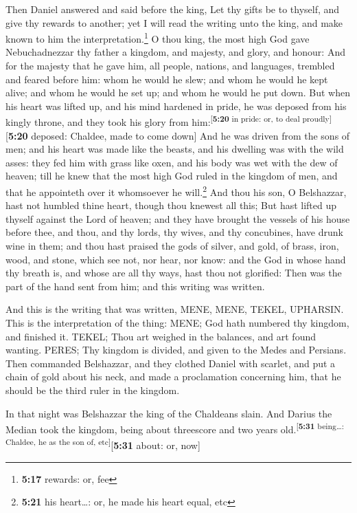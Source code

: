  Then Daniel answered and said before the king, Let thy
gifts be to thyself, and give thy rewards to another; yet I will read
the writing unto the king, and make known to him the
interpretation.\footnote{\textbf{5:17} rewards: or, fee} 
O thou king, the most high God gave Nebuchadnezzar thy father a kingdom,
and majesty, and glory, and honour:  And for the majesty
that he gave him, all people, nations, and languages, trembled and
feared before him: whom he would he slew; and whom he would he kept
alive; and whom he would he set up; and whom he would he put down.
 But when his heart was lifted up, and his mind hardened
in pride, he was deposed from his kingly throne, and they took his glory
from him:\textsuperscript{{[}\textbf{5:20} in pride: or, to deal
proudly{]}}{[}\textbf{5:20} deposed: Chaldee, made to come down{]}
 And he was driven from the sons of men; and his heart
was made like the beasts, and his dwelling was with the wild asses: they
fed him with grass like oxen, and his body was wet with the dew of
heaven; till he knew that the most high God ruled in the kingdom of men,
and that he appointeth over it whomsoever he will.\footnote{\textbf{5:21}
  his heart\ldots: or, he made his heart equal, etc}  And
thou his son, O Belshazzar, hast not humbled thine heart, though thou
knewest all this;  But hast lifted up thyself against the
Lord of heaven; and they have brought the vessels of his house before
thee, and thou, and thy lords, thy wives, and thy concubines, have drunk
wine in them; and thou hast praised the gods of silver, and gold, of
brass, iron, wood, and stone, which see not, nor hear, nor know: and the
God in whose hand thy breath is, and whose are all thy ways, hast thou
not glorified:  Then was the part of the hand sent from
him; and this writing was written.

 And this is the writing that was written, MENE, MENE,
TEKEL, UPHARSIN.  This is the interpretation of the
thing: MENE; God hath numbered thy kingdom, and finished it.
 TEKEL; Thou art weighed in the balances, and art found
wanting.  PERES; Thy kingdom is divided, and given to the
Medes and Persians.  Then commanded Belshazzar, and they
clothed Daniel with scarlet, and put a chain of gold about his neck, and
made a proclamation concerning him, that he should be the third ruler in
the kingdom.

 In that night was Belshazzar the king of the Chaldeans
slain.  And Darius the Median took the kingdom, being
about threescore and two years old.\textsuperscript{{[}\textbf{5:31}
being\ldots: Chaldee, he as the son of, etc{]}}{[}\textbf{5:31} about:
or, now{]}

